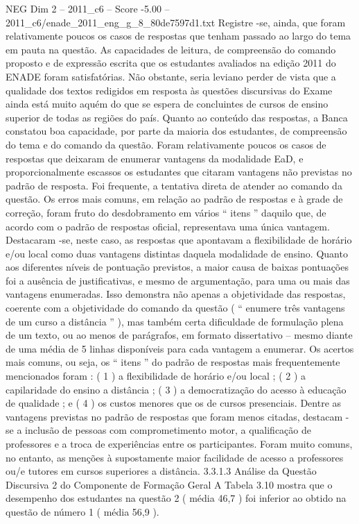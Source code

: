 \begin{textsample}{NEG Dim 2 – 2011\_c6 – Score -5.00 – 2011\_c6/enade\_2011\_eng\_g\_8\_80de7597d1.txt}
Registre -se, ainda, que foram relativamente poucos os casos de respostas que tenham passado ao largo do tema em pauta na questão.
As capacidades de leitura, de compreensão do comando proposto e de expressão escrita que os estudantes avaliados na edição 2011 do ENADE foram satisfatórias.
Não obstante, seria leviano perder de vista que a qualidade dos textos redigidos em resposta às questões discursivas do Exame ainda está muito aquém do que se espera de concluintes de cursos de ensino superior de todas as regiões do país.
Quanto ao conteúdo das respostas, a Banca constatou boa capacidade, por parte da maioria dos estudantes, de compreensão do tema e do comando da questão.
Foram relativamente poucos os casos de respostas que deixaram de enumerar vantagens da modalidade EaD, e proporcionalmente escassos os estudantes que citaram vantagens não previstas no padrão de resposta.
Foi frequente, a tentativa direta de atender ao comando da questão.
Os erros mais comuns, em relação ao padrão de respostas e à grade de correção, foram fruto do desdobramento em vários “ itens ” daquilo que, de acordo com o padrão de respostas oficial, representava uma única vantagem.
Destacaram -se, neste caso, as respostas que apontavam a flexibilidade de horário e/ou local como duas vantagens distintas daquela modalidade de ensino.
Quanto aos diferentes níveis de pontuação previstos, a maior causa de baixas pontuações foi a ausência de justificativas, e mesmo de argumentação, para uma ou mais das vantagens enumeradas.
Isso demonstra não apenas a objetividade das respostas, coerente com a objetividade do comando da questão ( “ enumere três vantagens de um curso a distância ” ), mas também certa dificuldade de formulação plena de um texto, ou ao menos de parágrafos, em formato dissertativo – mesmo diante de uma média de 5 linhas disponíveis para cada vantagem a enumerar.
Os acertos mais comuns, ou seja, os “ itens ” do padrão de respostas mais frequentemente mencionados foram : ( 1 ) a flexibilidade de horário e/ou local ; ( 2 ) a capilaridade do ensino a distância ; ( 3 ) a democratização do acesso à educação de qualidade ; e ( 4 ) os custos menores que os de cursos presenciais.
Dentre as vantagens previstas no padrão de respostas que foram menos citadas, destacam -se a inclusão de pessoas com comprometimento motor, a qualificação de professores e a troca de experiências entre os participantes.
Foram muito comuns, no entanto, as menções à supostamente maior facilidade de acesso a professores ou/e tutores em cursos superiores a distância. 3.3.1.3 Análise da Questão Discursiva 2 do Componente de Formação Geral A Tabela 3.10 mostra que o desempenho dos estudantes na questão 2 ( média 46,7 ) foi inferior ao obtido na questão de número 1 ( média 56,9 ).

\end{textsample}
